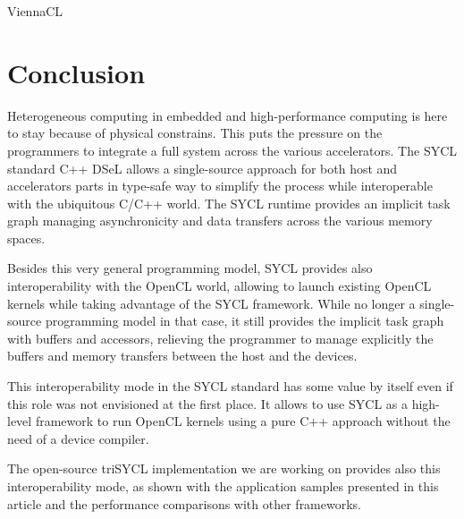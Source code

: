\documentclass[sigplan, review]{acmart}
\begin{document}
ViennaCL


\section{Conclusion}
\label{sec:conclusion}

Heterogeneous computing in embedded and high-performance computing is
here to stay because of physical constrains. This puts the pressure on
the programmers to integrate a full system across the various
accelerators. The SYCL standard C++ DSeL allows a single-source
approach for both host and accelerators parts in type-safe way to
simplify the process while interoperable with the ubiquitous C/C++
world. The SYCL runtime provides an implicit task graph managing
asynchronicity and data transfers across the various memory spaces.

Besides this very general programming model, SYCL provides also
interoperability with the OpenCL world, allowing to launch existing
OpenCL kernels while taking advantage of the SYCL framework. While no
longer a single-source programming model in that case, it still
provides the implicit task graph with buffers and accessors, relieving
the programmer to manage explicitly the buffers and memory transfers
between the host and the devices.

This interoperability mode in the SYCL standard has some value by
itself even if this role was not envisioned at the first place. It
allows to use SYCL as a high-level framework to run OpenCL kernels
using a pure C++ approach without the need of a device compiler.

The open-source triSYCL implementation \cite{triSYCL} we are working
on provides also this interoperability mode, as shown with the
application samples presented in this article and the performance
comparisons with other frameworks.





\end{document}
